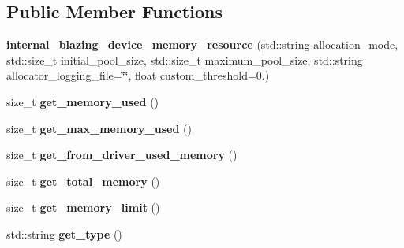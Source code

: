\subsection*{Public Member Functions}
\begin{DoxyCompactItemize}
\item 
\mbox{\label{classinternal__blazing__device__memory__resource_a41f3d42bb79b7a075ee7be756359ec5c}} 
{\bfseries internal\+\_\+blazing\+\_\+device\+\_\+memory\+\_\+resource} (std\+::string allocation\+\_\+mode, std\+::size\+\_\+t initial\+\_\+pool\+\_\+size, std\+::size\+\_\+t maximum\+\_\+pool\+\_\+size, std\+::string allocator\+\_\+logging\+\_\+file=\char`\"{}\char`\"{}, float custom\+\_\+threshold=0.)
\item 
\mbox{\label{classinternal__blazing__device__memory__resource_a9d3379a56c89d6271be271af0fa7bda0}} 
size\+\_\+t {\bfseries get\+\_\+memory\+\_\+used} ()
\item 
\mbox{\label{classinternal__blazing__device__memory__resource_a163f71b617454209096445a43b16eea9}} 
size\+\_\+t {\bfseries get\+\_\+max\+\_\+memory\+\_\+used} ()
\item 
\mbox{\label{classinternal__blazing__device__memory__resource_ab67544007992f36353b0c027020b0a37}} 
size\+\_\+t {\bfseries get\+\_\+from\+\_\+driver\+\_\+used\+\_\+memory} ()
\item 
\mbox{\label{classinternal__blazing__device__memory__resource_abf3760173cfd908e860455e1ae0da94d}} 
size\+\_\+t {\bfseries get\+\_\+total\+\_\+memory} ()
\item 
\mbox{\label{classinternal__blazing__device__memory__resource_a7243f3badefc2860852aed9ed0ec98f3}} 
size\+\_\+t {\bfseries get\+\_\+memory\+\_\+limit} ()
\item 
\mbox{\label{classinternal__blazing__device__memory__resource_a256501b6943a5d3da6041559fc375d30}} 
std\+::string {\bfseries get\+\_\+type} ()

\end{DoxyCompactItemize}

